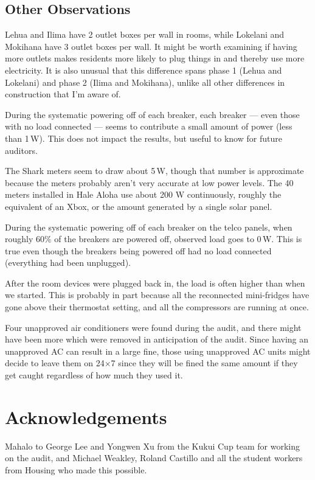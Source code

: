 \documentclass[11pt,final]{article}
\newcommand{\W}{\,W\xspace}
\begin{document}
\subsection{Other Observations}

Lehua and Ilima have 2 outlet boxes per wall in rooms, while Lokelani and Mokihana have 3 outlet boxes per wall. It might be worth examining if having more outlets makes residents more likely to plug things in and thereby use more electricity. It is also unusual that this difference spans phase 1 (Lehua and Lokelani) and phase 2 (Ilima and Mokihana), unlike all other differences in construction that I'm aware of.

During the systematic powering off of each breaker, each breaker --- even those with no load connected --- seems to contribute a small amount of power (less than 1\W). This does not impact the results, but useful to know for future auditors.

The Shark meters seem to draw about 5\W, though that number is approximate because the meters probably aren't very accurate at low power levels. The 40 meters installed in Hale Aloha use about 200 W continuously, roughly the equivalent of an Xbox, or the amount generated by a single solar panel.

During the systematic powering off of each breaker on the telco panels, when roughly 60\% of the breakers are powered off, observed load goes to 0\W. This is true even though the breakers being powered off had no load connected (everything had been unplugged).

After the room devices were plugged back in, the load is often higher than when we started. This is probably in part because all the reconnected mini-fridges have gone above their thermostat setting, and all the compressors are running at once.

Four unapproved air conditioners were found during the audit, and there might have been more which were removed in anticipation of the audit. Since having an unapproved AC can result in a large fine, those using unapproved AC units might decide to leave them on 24$\times$7 since they will be fined the same amount if they get caught regardless of how much they used it.

\section{Acknowledgements}

Mahalo to George Lee and Yongwen Xu from the Kukui Cup team for working on the audit, and Michael Weakley, Roland Castillo and all the student workers from Housing who made this possible.
\end{document}
